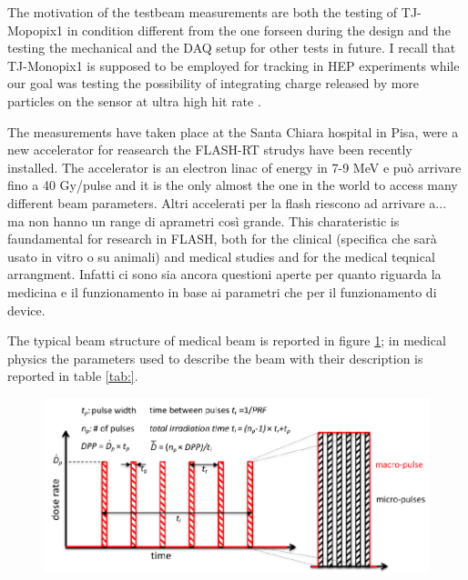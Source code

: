 The motivation of the testbeam measurements are both the testing of TJ-Mopopix1 in condition different from the one forseen during the design and the testing the mechanical and the DAQ setup for other tests in future. I recall that TJ-Monopix1 is supposed to be employed for tracking in HEP experiments while our goal was testing the possibility of integrating charge released by more particles on the sensor at ultra high hit rate .

The measurements have taken place at the Santa Chiara hospital in Pisa, were a new accelerator for reasearch the FLASH-RT strudys have been recently installed. 
The accelerator is an electron linac of energy in 7-9 MeV  e può arrivare fino a 40 Gy/pulse and it is the only almost the one in the world to access many different beam parameters. Altri accelerati per la flash riescono ad arrivare a... ma non hanno un range di aprametri così grande. 
This charateristic is faundamental for research in FLASH, both for the clinical (specifica che sarà usato in vitro o su animali) and medical studies and for the medical teqnical arrangment. 
Infatti ci sono sia ancora questioni aperte per quanto riguarda la medicina e il funzionamento in base ai parametri che per il funzionamento di device. 

The typical beam structure of medical beam is reported in figure \ref{fig:}; in medical physics the parameters used to describe the beam with their description is reported in table \ref{tab:}. 
\begin{figure}
   \centering
   \includegraphics[width=.9\linewidth]{figures/test_beam/beam_structure.pdf}
   \caption{}
   \label{fig:}
\end{figure}

